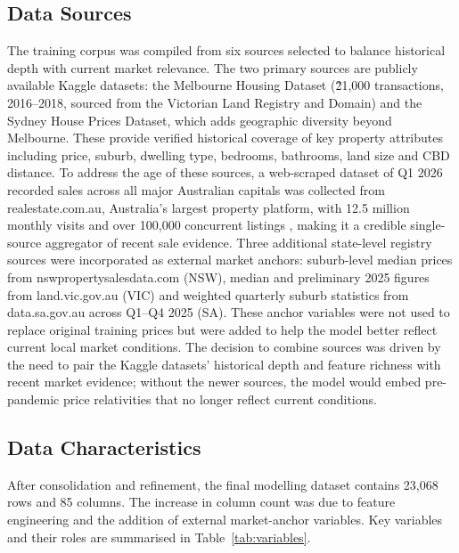 \documentclass[a4paper,12pt]{article}
\begin{document}
\subsection{Data Sources}
The training corpus was compiled from six sources selected to balance historical depth with current market relevance. The two primary sources are publicly available Kaggle datasets: the Melbourne Housing Dataset (\~21,000 transactions, 2016--2018, sourced from the Victorian Land Registry and Domain) and the Sydney House Prices Dataset, which adds geographic diversity beyond Melbourne. These provide verified historical coverage of key property attributes including price, suburb, dwelling type, bedrooms, bathrooms, land size and CBD distance. To address the age of these sources, a web-scraped dataset of Q1 2026 recorded sales across all major Australian capitals was collected from realestate.com.au, Australia's largest property platform, with 12.5 million monthly visits and over 100,000 concurrent listings  \cite{rea2024audience},  making it a credible single-source aggregator of recent sale evidence. Three additional state-level registry sources were incorporated as external market anchors: suburb-level median prices from nswpropertysalesdata.com (NSW), median and preliminary 2025 figures from land.vic.gov.au (VIC) and weighted quarterly suburb statistics from data.sa.gov.au across Q1--Q4 2025 (SA). These anchor variables were not used to replace original training prices but were added to help the model better reflect current local market conditions. The decision to combine sources was driven by the need to pair the Kaggle datasets' historical depth and feature richness with recent market evidence; without the newer sources, the model would embed pre-pandemic price relativities that no longer reflect current conditions. 


\subsection{Data Characteristics}
After consolidation and refinement, the final modelling dataset contains 23,068 rows and 85 columns. The increase in column count was due to feature engineering and the addition of external market-anchor variables. Key variables and their roles are summarised in Table~\ref{tab:variables}.
\end{document}
